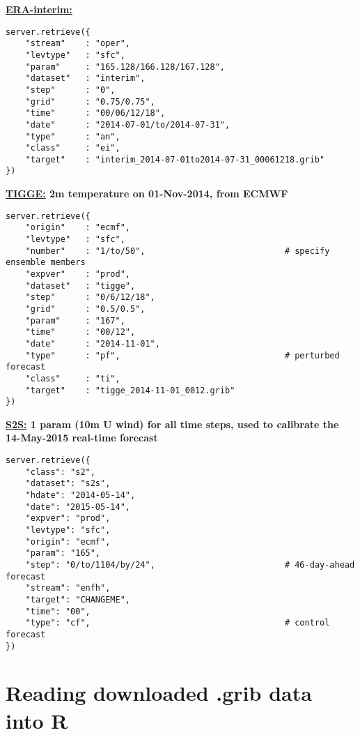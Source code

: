 \documentclass[10pt,fleqn]{article}
\begin{document}
\begin{framed}
\textbf{\href{https://software.ecmwf.int/wiki/display/WEBAPI/Python+ERA-interim+examples}{ERA-interim:} \footnotesize{}}
\begin{lstlisting}   
server.retrieve({
    "stream"    : "oper",
    "levtype"   : "sfc",
    "param"     : "165.128/166.128/167.128",
    "dataset"   : "interim",
    "step"      : "0",
    "grid"      : "0.75/0.75",
    "time"      : "00/06/12/18",
    "date"      : "2014-07-01/to/2014-07-31",
    "type"      : "an",
    "class"     : "ei",
    "target"    : "interim_2014-07-01to2014-07-31_00061218.grib"
})
\end{lstlisting}
\end{framed} %

\begin{framed}
\textbf{\href{https://software.ecmwf.int/wiki/display/WEBAPI/Python+TIGGE+examples}{TIGGE:} \footnotesize{2m temperature on 01-Nov-2014, from ECMWF}}
\begin{lstlisting}
server.retrieve({
    "origin"    : "ecmf",
    "levtype"   : "sfc",
    "number"    : "1/to/50",							# specify ensemble members
    "expver"    : "prod",
    "dataset"   : "tigge",
    "step"      : "0/6/12/18",
    "grid"      : "0.5/0.5",
    "param"     : "167",
    "time"      : "00/12",
    "date"      : "2014-11-01",
    "type"      : "pf",									# perturbed forecast
    "class"     : "ti",
    "target"    : "tigge_2014-11-01_0012.grib"
})
\end{lstlisting}
\end{framed} %


\begin{framed} %
\textbf{\href{https://software.ecmwf.int/wiki/display/WEBAPI/Python+S2S+examples}{S2S:} \footnotesize{1 param (10m U wind) for all time steps, used to calibrate the 14-May-2015 real-time forecast}}
\begin{lstlisting}
server.retrieve({
    "class": "s2",
    "dataset": "s2s",
    "hdate": "2014-05-14",
    "date": "2015-05-14",
    "expver": "prod",
    "levtype": "sfc",
    "origin": "ecmf",
    "param": "165",
    "step": "0/to/1104/by/24",							# 46-day-ahead forecast
    "stream": "enfh",
    "target": "CHANGEME",
    "time": "00",
    "type": "cf",										# control forecast
})
\end{lstlisting}
\end{framed}

\newpage
\section{Reading downloaded .grib data into R}
\end{document}
